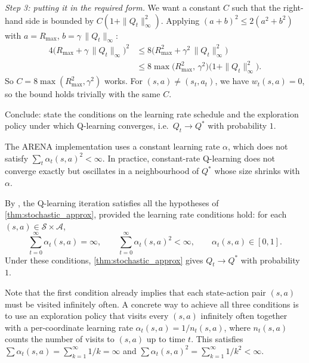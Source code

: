 \documentclass[11pt]{article}
\newcommand{\cS}{\mathcal{S}}
\newcommand{\cA}{\mathcal{A}}
\begin{document}
\begin{solution}
\emph{Step 3: putting it in the required form.} We want a constant $C$ such that the right-hand side is bounded by $C(1 + \|Q_t\|_\infty^2)$. Applying $(a+b)^2 \le 2(a^2 + b^2)$ with $a = R_{\max}$, $b = \gamma\,\|Q_t\|_\infty$:
\begin{align*}
4\bigl(R_{\max} + \gamma\,\|Q_t\|_\infty\bigr)^2
&\le 8\bigl(R_{\max}^2 + \gamma^2\,\|Q_t\|_\infty^2\bigr) \\
&\le 8\max\!\bigl(R_{\max}^2,\, \gamma^2\bigr)\bigl(1 + \|Q_t\|_\infty^2\bigr).
\end{align*}
So $C = 8\max(R_{\max}^2, \gamma^2)$ works. For $(s,a) \neq (s_t, a_t)$, we have $w_t(s,a) = 0$, so the bound holds trivially with the same $C$.
\end{solution}

\begin{exercise}
\label{prob:q_learning_converge} Conclude: state the conditions on the learning rate schedule and the exploration policy under which Q-learning converges, i.e.\ $Q_t \to Q^*$ with probability $1$.
\begin{remark}
The ARENA implementation uses a constant learning rate $\alpha$, which does not satisfy $\sum_t \alpha_t(s,a)^2 < \infty$. In practice, constant-rate Q-learning does not converge exactly but oscillates in a neighbourhood of $Q^*$ whose size shrinks with $\alpha$.
\end{remark}
\end{exercise}

\begin{solution}
By , the Q-learning iteration satisfies all the hypotheses of \cref{thm:stochastic_approx}, provided the learning rate conditions hold: for each $(s,a) \in \cS \times \cA$,
$$
\sum_{t=0}^{\infty} \alpha_t(s,a) = \infty, \qquad \sum_{t=0}^{\infty} \alpha_t(s,a)^2 < \infty, \qquad \alpha_t(s,a) \in [0,1].
$$
Under these conditions, \cref{thm:stochastic_approx} gives $Q_t \to Q^*$ with probability $1$.

Note that the first condition already implies that each state-action pair $(s,a)$ must be visited infinitely often. A concrete way to achieve all three conditions is to use an exploration policy that visits every $(s,a)$ infinitely often together with a per-coordinate learning rate $\alpha_t(s,a) = 1/n_t(s,a)$, where $n_t(s,a)$ counts the number of visits to $(s,a)$ up to time $t$. This satisfies $\sum \alpha_t(s,a) = \sum_{k=1}^\infty 1/k = \infty$ and $\sum \alpha_t(s,a)^2 = \sum_{k=1}^\infty 1/k^2 < \infty$.
\end{solution}
\end{document}

